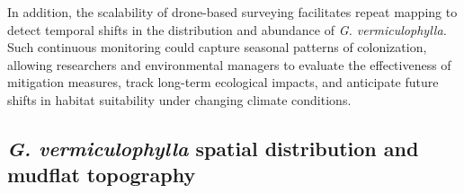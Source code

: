 \documentclass[
  letterpaper,
  DIV=11,
  numbers=noendperiod]{scrartcl}
\begin{document}
In addition, the scalability of drone-based surveying facilitates repeat
mapping to detect temporal shifts in the distribution and abundance of
\emph{G. vermiculophylla.} Such continuous monitoring could capture
seasonal patterns of colonization, allowing researchers and
environmental managers to evaluate the effectiveness of mitigation
measures, track long-term ecological impacts, and anticipate future
shifts in habitat suitability under changing climate conditions.

\subsection{\texorpdfstring{\emph{G. vermiculophylla} spatial
distribution and mudflat
topography}{G. vermiculophylla spatial distribution and mudflat topography}}\label{g.-vermiculophylla-spatial-distribution-and-mudflat-topography}
\end{document}

